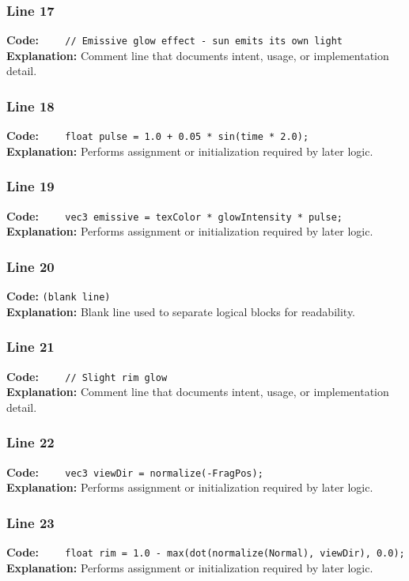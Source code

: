 \documentclass[11pt,a4paper]{article}
\begin{document}
\subsubsection*{Line 17}
\textbf{Code:} \verb|    // Emissive glow effect - sun emits its own light|\\
\textbf{Explanation:} Comment line that documents intent, usage, or implementation detail.

\subsubsection*{Line 18}
\textbf{Code:} \verb|    float pulse = 1.0 + 0.05 * sin(time * 2.0);|\\
\textbf{Explanation:} Performs assignment or initialization required by later logic.

\subsubsection*{Line 19}
\textbf{Code:} \verb|    vec3 emissive = texColor * glowIntensity * pulse;|\\
\textbf{Explanation:} Performs assignment or initialization required by later logic.

\subsubsection*{Line 20}
\textbf{Code:} \texttt{(blank line)}\\
\textbf{Explanation:} Blank line used to separate logical blocks for readability.

\subsubsection*{Line 21}
\textbf{Code:} \verb|    // Slight rim glow|\\
\textbf{Explanation:} Comment line that documents intent, usage, or implementation detail.

\subsubsection*{Line 22}
\textbf{Code:} \verb|    vec3 viewDir = normalize(-FragPos);|\\
\textbf{Explanation:} Performs assignment or initialization required by later logic.

\subsubsection*{Line 23}
\textbf{Code:} \verb|    float rim = 1.0 - max(dot(normalize(Normal), viewDir), 0.0);|\\
\textbf{Explanation:} Performs assignment or initialization required by later logic.
\end{document}
